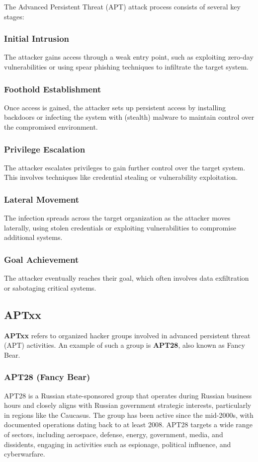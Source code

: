 The Advanced Persistent Threat (APT) attack process consists of several key stages:

\subsubsection{Initial Intrusion}
The attacker gains access through a weak entry point, such as exploiting zero-day vulnerabilities or using spear phishing techniques to infiltrate the target system.

\subsubsection{Foothold Establishment}
Once access is gained, the attacker sets up persistent access by installing backdoors or infecting the system with (stealth) malware to maintain control over the compromised environment.

\subsubsection{Privilege Escalation}
The attacker escalates privileges to gain further control over the target system. This involves techniques like credential stealing or vulnerability exploitation.

\subsubsection{Lateral Movement}
The infection spreads across the target organization as the attacker moves laterally, using stolen credentials or exploiting vulnerabilities to compromise additional systems.

\subsubsection{Goal Achievement}
The attacker eventually reaches their goal, which often involves data exfiltration or sabotaging critical systems.


\subsection{APTxx}

\textbf{APTxx} refers to organized hacker groups involved in advanced persistent threat (APT) activities. An example of such a group is \textbf{APT28}, also known as Fancy Bear.

\subsubsection{APT28 (Fancy Bear)}
APT28 is a Russian state-sponsored group that operates during Russian business hours and closely aligns with Russian government strategic interests, particularly in regions like the Caucasus. The group has been active since the mid-2000s, with documented operations dating back to at least 2008. APT28 targets a wide range of sectors, including aerospace, defense, energy, government, media, and dissidents, engaging in activities such as espionage, political influence, and cyberwarfare.

